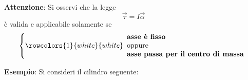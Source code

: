 \documentclass[a4paper]{extarticle}
\begin{document}
\vspace{1em}
\noindent
\textbf{Attenzione}: Si osservi che la legge
\[\vec \tau = I \vec \alpha\]
è valida e applicabile solamente se
\[\left\{
    \rowcolors{1}{white}{white}
    \begin{array}{l}
      \textbf{asse è fisso}\\
      \text{oppure}\\
      \textbf{asse passa per il centro di massa}
    \end{array}
\right.\]

\vspace{1em}
\noindent
\textbf{Esempio}: Si consideri il cilindro seguente:

\begin{figure}[H]
  \centering


  \newcommand{\tdcyl}[5]{%
        \path (1,0,0);
        \pgfgetlastxy{\cylxx}{\cylxy}
        \path (0,1,0);
        \pgfgetlastxy{\cylyx}{\cylyy}
        \path (0,0,1);
        \pgfgetlastxy{\cylzx}{\cylzy}
        \pgfmathsetmacro{\cylt}{(\cylzy * \cylyx - \cylzx * \cylyy)/ (\cylzy * \cylxx - \cylzx * \cylxy)}
        \pgfmathsetmacro{\ang}{atan(\cylt)}
        \pgfmathsetmacro{\ct}{1/sqrt(1 + (\cylt)^2)}
        \pgfmathsetmacro{\st}{\cylt * \ct}
        \filldraw[fill=white] (#4*\ct+#1,#4*\st+#2,#3) -- ++(0,0,#5) arc[start angle=\ang,delta angle=-180,radius=#4] -- ++(0,0,-#5) arc[start angle=\ang+180,delta angle=180,radius=#4];
        \filldraw[fill=white] (#1,#2,#3+#5) circle[radius=#4];
    }


\end{figure}
\end{document}
